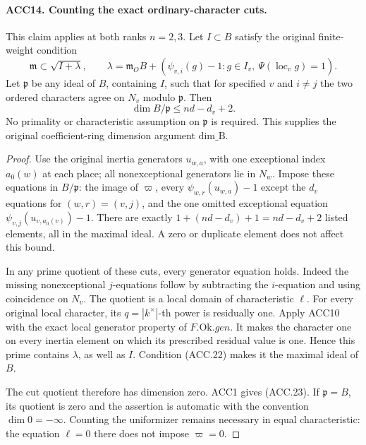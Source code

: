 \documentclass[11pt,a4paper]{article}
\numberwithin{equation}{section}
\theoremstyle{remark}\newtheorem{remark}[theorem]{Remark}
\begin{document}
\paragraph{ACC14. Counting the exact ordinary-character cuts.}
\label{claim:ACC14}
This claim applies at both ranks \(n=2,3\).  Let \(I\subset B\)
satisfy the original finite-weight condition
\[
 \mathfrak m\subset\sqrt{I+\lambda},\qquad
 \lambda=\mathfrak m_O B+
  (\psi_{v,i}(g)-1:g\in I_v,\ \Psi(\operatorname{loc}_v g)=1).
                                                               \tag{ACC.22}
\]
Let \(\mathfrak p\) be any ideal of \(B\), containing \(I\),
such that for specified \(v\) and \(i\ne j\) the two ordered
characters agree on \(N_v\) modulo \(\mathfrak p\).  Then
\[
                        \dim B/\mathfrak p\le nd-d_v+2.
                                                               \tag{ACC.23}
\]
No primality or characteristic assumption on \(\mathfrak p\)
is required.  This supplies the original coefficient-ring
dimension argument \(\mathrm{dim\_\allowbreak B}\).

\begin{proof}
Use the original inertia generators \(u_{w,a}\), with one exceptional
index \(a_0(w)\) at each place; all nonexceptional generators lie
in \(N_w\).  Impose these equations in \(B/\mathfrak p\):
the image of \(\varpi\), every
\(\psi_{w,r}(u_{w,a})-1\) except the \(d_v\) equations for
\((w,r)=(v,j)\), and the one omitted exceptional equation
\(\psi_{v,j}(u_{v,a_0(v)})-1\).  There are exactly
\(1+(nd-d_v)+1=nd-d_v+2\) listed elements, all in the maximal
ideal.  A zero or duplicate element does not affect this bound.

In any prime quotient of these cuts, every generator equation holds.
Indeed the missing nonexceptional \(j\)-equations follow by
subtracting the \(i\)-equation and using coincidence on \(N_v\).
The quotient is a local domain of characteristic \(\ell\).
For every original local character, its \(q=|k^\times|\)-th
power is residually one.  Apply ACC10 with the exact local generator
property of \(F.\mathrm{Ok}.gen\).  It makes the character one
on every inertia element on which its prescribed residual value is
one.  Hence this prime contains \(\lambda\), as well as \(I\).
Condition (ACC.22) makes it the maximal ideal of \(B\).

The cut quotient therefore has dimension zero.  ACC1 gives (ACC.23).
If \(\mathfrak p=B\), its quotient is zero and the assertion is
automatic with the convention \(\dim0=-\infty\).  Counting the
uniformizer remains necessary in equal characteristic: the equation
\(\ell=0\) there does not impose \(\varpi=0\).
\end{proof}
\end{document}
